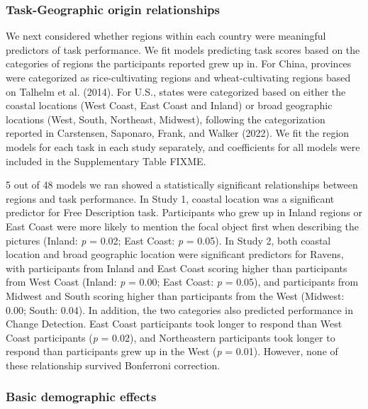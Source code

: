 \documentclass[
  man,floatsintext]{apa6}
\begin{document}
\hypertarget{task-geographic-origin-relationships}{%
\subsubsection{Task-Geographic origin relationships}\label{task-geographic-origin-relationships}}

We next considered whether regions within each country were meaningful predictors of task performance. We fit models predicting task scores based on the categories of regions the participants reported grew up in. For China, provinces were categorized as rice-cultivating regions and wheat-cultivating regions based on Talhelm et al. (2014). For U.S., states were categorized based on either the coastal locations (West Coast, East Coast and Inland) or broad geographic locations (West, South, Northeast, Midwest), following the categorization reported in Carstensen, Saponaro, Frank, and Walker (2022). We fit the region models for each task in each study separately, and coefficients for all models were included in the Supplementary Table FIXME.

5 out of 48 models we ran showed a statistically significant relationships between regions and task performance. In Study 1, coastal location was a significant predictor for Free Description task. Participants who grew up in Inland regions or East Coast were more likely to mention the focal object first when describing the pictures (Inland: \emph{p} = 0.02; East Coast: \emph{p} = 0.05). In Study 2, both coastal location and broad geographic location were significant predictors for Ravens, with participants from Inland and East Coast scoring higher than participants from West Coast (Inland: \emph{p} = 0.00; East Coast: \emph{p} = 0.05), and participants from Midwest and South scoring higher than participants from the West (Midwest: 0.00; South: 0.04). In addition, the two categories also predicted performance in Change Detection. East Coast participants took longer to respond than West Coast participants (\emph{p} = 0.02), and Northeastern participants took longer to respond than participants grew up in the West (\emph{p} = 0.01). However, none of these relationship survived Bonferroni correction.

\hypertarget{basic-demographic-effects}{%
\subsubsection{Basic demographic effects}\label{basic-demographic-effects}}
\end{document}
